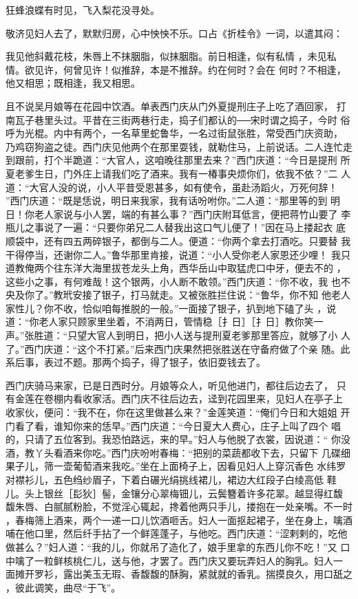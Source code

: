 狂蜂浪蝶有时见，飞入梨花没寻处。

敬济见妇人去了，默默归房，心中怏怏不乐。口占《折桂令》一词，以遣其闷：

我见他斜戴花枝，朱唇上不抹胭脂，似抹胭脂。前日相逢，似有私情
，未见私情。欲见许，何曾见许！似推辞，本是不推辞。约在何时？会在
何时？不相逢，他又相思；既相逢，我又相思。

且不说吴月娘等在花园中饮酒。单表西门庆从门外夏提刑庄子上吃了酒回家，
打南瓦子巷里头过。平昔在三街两巷行走，捣子们都认的──宋时谓之捣子，今时
俗呼为光棍。内中有两个，一名草里蛇鲁华，一名过街鼠张胜，常受西门庆资助，
乃鸡窃狗盗之徒。西门庆见他两个在那里耍钱，就勒住马，上前说话。二人连忙走
到跟前，打个半跪道：“大官人，这咱晚往那里去来？”西门庆道：“今日是提刑
所夏老爹生日，门外庄上请我们吃了酒来。我有一椿事央烦你们，依我不依？”二
人道：“大官人没的说，小人平昔受恩甚多，如有使令，虽赴汤蹈火，万死何辞！
”西门庆道：“既是恁说，明日来我家，我有话吩咐你。”二人道：“那里等的到
明日！你老人家说与小人罢，端的有甚么事？”西门庆附耳低言，便把蒋竹山要了
李瓶儿之事说了一遍：“只要你弟兄二人替我出这口气儿便了！”因在马上搂起衣
底顺袋中，还有四五两碎银子，都倒与二人。便道：“你两个拿去打酒吃。只要替
我干得停当，还谢你二人。”鲁华那里肯接，说道：“小人受你老人家恩还少哩！
我只道教俺两个往东洋大海里拔苍龙头上角，西华岳山中取猛虎口中牙，便去不的
，这些小之事，有何难哉！这个银两，小人断不敢领。”西门庆道：“你不收，我
也不央及你了。”教玳安接了银子，打马就走。又被张胜拦住说：“鲁华，你不知
他老人家性儿？你不收，恰似咱每推脱的一般。”一面接了银子，扒到地下磕了头
，说道：“你老人家只顾家里坐着，不消两日，管情稳［扌日］［扌日］教你笑一
声。”张胜道：“只望大官人到明日，把小人送与提刑夏老爹那里答应，就够了小
人了。”西门庆道：“这个不打紧。”后来西门庆果然把张胜送在守备府做了个亲
随。此系后事，表过不题。那两个捣子，得了银子，依旧耍钱去了。

西门庆骑马来家，已是日西时分。月娘等众人，听见他进门，都往后边去了，
只有金莲在卷棚内看收家活。西门庆不往后边去，迳到花园里来，见妇人在亭子上
收家伙，便问：“我不在，你在这里做甚么来？”金莲笑道：“俺们今日和大姐姐
开门看了看，谁知你来的恁早。”西门庆道：“今日夏大人费心，庄子上叫了四个
唱的，只请了五位客到。我恐怕路远，来的早。”妇人与他脱了衣裳，因说道：“
你没酒，教丫头看酒来你吃。”西门庆吩咐春梅：“把别的菜蔬都收下去，只留下
几碟细果子儿，筛一壶葡萄酒来我吃。”坐在上面椅子上，因看见妇人上穿沉香色
水纬罗对襟衫儿，五色绉纱眉子，下着白碾光绢挑线裙儿，裙边大红段子白绫高低
鞋儿。头上银丝［髟狄］髻，金镶分心翠梅钿儿，云鬓簪着许多花翠。越显得红馥
馥朱唇、白腻腻粉脸，不觉淫心辄起，搀着他两只手儿，搂抱在一处亲嘴。不一时
，春梅筛上酒来，两个一递一口儿饮酒咂舌。妇人一面抠起裙子，坐在身上，噙酒
哺在他口里，然后纤手拈了一个鲜莲蓬子，与他吃。西门庆道：“涩剌剌的，吃他
做甚么？”妇人道：“我的儿，你就吊了造化了，娘手里拿的东西儿你不吃！”又
口中噙了一粒鲜核桃仁儿，送与他，才罢了。西门庆又要玩弄妇人的胸乳。妇人一
面摊开罗衫，露出美玉无瑕、香馥馥的酥胸，紧就就的香乳。揣摸良久，用口舐之
，彼此调笑，曲尽“于飞”。

